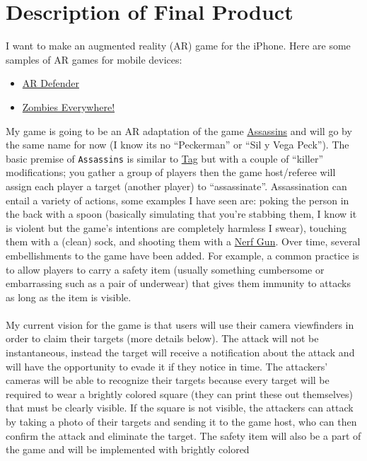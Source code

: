 \documentclass{article}
\begin{document}
\section{Description of Final Product}
I want to make an augmented reality (AR) game for the iPhone. Here are some samples
of AR games for mobile devices:
\begin{itemize}
  \item\href{http://www.youtube.com/watch?v=rB5xUStsUs4}{AR Defender}
  \item\href{http://www.youtube.com/watch?v=Ce1U_9DRcac}{Zombies Everywhere!}
\end{itemize}
My game is going to be an AR adaptation of the game 
\href{http://en.wikipedia.org/wiki/Assassin_(game)}{Assassins} and
will go by the same name for now (I know its no ``Peckerman'' or 
``Sil y Vega Peck''). The basic premise of \texttt{Assassins} is similar to 
\href{http://en.wikipedia.org/wiki/Tag_(game)}{Tag}
but with a couple of ``killer'' modifications; you gather a group
of players then the game host/referee will assign each player a target
(another player) to ``assassinate''. Assassination can entail a variety of
actions, some examples I have seen are: poking the person in the back with a spoon 
(basically simulating that you're stabbing them, I know it is violent but the 
game's intentions are completely harmless I swear), 
touching them with a (clean) sock, and shooting them with a 
\href{http://www.hasbro.com/nerf/en_us/}{Nerf Gun}. Over time, several 
embellishments to the game have been added. For example, a common practice
is to allow players to carry a safety item (usually something 
cumbersome or embarrassing such as a pair of underwear) that gives them
immunity to attacks as long as the item is visible.
\\\\
My current vision for the game is that users will use their camera 
viewfinders in order to claim their targets (more details below). 
The attack will not be instantaneous, instead the target will receive
a notification about the attack and will have the opportunity 
to evade it if they notice in time. The attackers' cameras will be able to
recognize their targets because every target will be required to 
wear a brightly colored square (they can print these out themselves)
that must be clearly visible. If the square is not visible, the attackers
can attack by taking a photo of their targets and sending it to the game host, who can 
then confirm the attack and eliminate the target. The safety item will also
be a part of the game and will be implemented with brightly colored 
\end{document}

